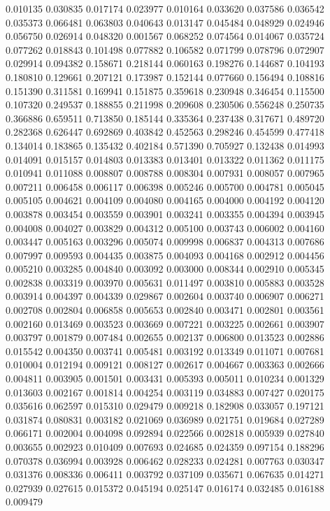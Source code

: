 0.010135
0.030835
0.017174
0.023977
0.010164
0.033620
0.037586
0.036542
0.035373
0.066481
0.063803
0.040643
0.013147
0.045484
0.048929
0.024946
0.056750
0.026914
0.048320
0.001567
0.068252
0.074564
0.014067
0.035724
0.077262
0.018843
0.101498
0.077882
0.106582
0.071799
0.078796
0.072907
0.029914
0.094382
0.158671
0.218144
0.060163
0.198276
0.144687
0.104193
0.180810
0.129661
0.207121
0.173987
0.152144
0.077660
0.156494
0.108816
0.151390
0.311581
0.169941
0.151875
0.359618
0.230948
0.346454
0.115500
0.107320
0.249537
0.188855
0.211998
0.209608
0.230506
0.556248
0.250735
0.366886
0.659511
0.713850
0.185144
0.335364
0.237438
0.317671
0.489720
0.282368
0.626447
0.692869
0.403842
0.452563
0.298246
0.454599
0.477418
0.134014
0.183865
0.135432
0.402184
0.571390
0.705927
0.132438
0.014993
0.014091
0.015157
0.014803
0.013383
0.013401
0.013322
0.011362
0.011175
0.010941
0.011088
0.008807
0.008788
0.008304
0.007931
0.008057
0.007965
0.007211
0.006458
0.006117
0.006398
0.005246
0.005700
0.004781
0.005045
0.005105
0.004621
0.004109
0.004080
0.004165
0.004000
0.004192
0.004120
0.003878
0.003454
0.003559
0.003901
0.003241
0.003355
0.004394
0.003945
0.004008
0.004027
0.003829
0.004312
0.005100
0.003743
0.006002
0.004160
0.003447
0.005163
0.003296
0.005074
0.009998
0.006837
0.004313
0.007686
0.007997
0.009593
0.004435
0.003875
0.004093
0.004168
0.002912
0.004456
0.005210
0.003285
0.004840
0.003092
0.003000
0.008344
0.002910
0.005345
0.002838
0.003319
0.003970
0.005631
0.011497
0.003810
0.005883
0.003528
0.003914
0.004397
0.004339
0.029867
0.002604
0.003740
0.006907
0.006271
0.002708
0.002804
0.006858
0.005653
0.002840
0.003471
0.002801
0.003561
0.002160
0.013469
0.003523
0.003669
0.007221
0.003225
0.002661
0.003907
0.003797
0.001879
0.007484
0.002655
0.002137
0.006800
0.013523
0.002886
0.015542
0.004350
0.003741
0.005481
0.003192
0.013349
0.011071
0.007681
0.010004
0.012194
0.009121
0.008127
0.002617
0.004667
0.003363
0.002666
0.004811
0.003905
0.001501
0.003431
0.005393
0.005011
0.010234
0.001329
0.013603
0.002167
0.001814
0.004254
0.003119
0.034883
0.007427
0.020175
0.035616
0.062597
0.015310
0.029479
0.009218
0.182908
0.033057
0.197121
0.031874
0.080831
0.003182
0.021069
0.036989
0.021751
0.019684
0.027289
0.066171
0.002004
0.004098
0.092894
0.022566
0.002818
0.005939
0.027840
0.003655
0.002923
0.010409
0.007693
0.024685
0.024359
0.097154
0.188296
0.070378
0.036994
0.003928
0.006462
0.028233
0.024281
0.007763
0.030347
0.031376
0.008336
0.006411
0.003792
0.037109
0.035671
0.067635
0.014271
0.027939
0.027615
0.015372
0.045194
0.025147
0.016174
0.032485
0.016188
0.009479
